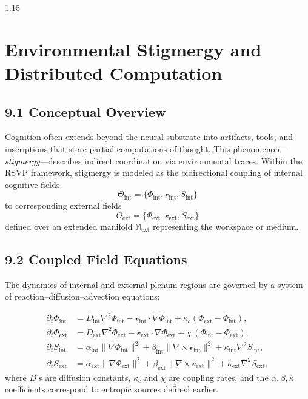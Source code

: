\documentclass[12pt,a4paper]{article}
\begin{document}
\begin{spacing}{1.15}
\section{Environmental Stigmergy and Distributed Computation}

\subsection{9.1 Conceptual Overview}

Cognition often extends beyond the neural substrate into artifacts, tools, and inscriptions that store partial computations of thought.  
This phenomenon—\emph{stigmergy}—describes indirect coordination via environmental traces.  
Within the RSVP framework, stigmergy is modeled as the bidirectional coupling of internal cognitive fields
\[
\Theta_{\mathrm{int}}=\{\Phi_{\mathrm{int}},\boldsymbol{\mathcal v}_{\mathrm{int}},S_{\mathrm{int}}\}
\]
to corresponding external fields
\[
\Theta_{\mathrm{ext}}=\{\Phi_{\mathrm{ext}},\boldsymbol{\mathcal v}_{\mathrm{ext}},S_{\mathrm{ext}}\}
\]
defined over an extended manifold $\mathbb{M}_{\mathrm{ext}}$ representing the workspace or medium.

\subsection{9.2 Coupled Field Equations}

The dynamics of internal and external plenum regions are governed by a system of reaction–diffusion–advection equations:

\begin{align}
\partial_t \Phi_{\mathrm{int}}
 &= D_{\mathrm{int}}\nabla^2 \Phi_{\mathrm{int}}
    - \boldsymbol{\mathcal v}_{\mathrm{int}}\!\cdot\!\nabla \Phi_{\mathrm{int}}
    + \kappa_c(\Phi_{\mathrm{ext}}-\Phi_{\mathrm{int}}), \label{eq:phi_int}\\[3pt]
\partial_t \Phi_{\mathrm{ext}}
 &= D_{\mathrm{ext}}\nabla^2 \Phi_{\mathrm{ext}}
    - \boldsymbol{\mathcal v}_{\mathrm{ext}}\!\cdot\!\nabla \Phi_{\mathrm{ext}}
    + \chi\,(\Phi_{\mathrm{int}}-\Phi_{\mathrm{ext}}), \label{eq:phi_ext}\\[3pt]
\partial_t S_{\mathrm{int}}
 &= \alpha_{\mathrm{int}}\|\nabla\Phi_{\mathrm{int}}\|^2
    + \beta_{\mathrm{int}}\|\nabla\!\times\!\boldsymbol{\mathcal v}_{\mathrm{int}}\|^2
    + \kappa_{\mathrm{int}}\nabla^2 S_{\mathrm{int}}, \\
\partial_t S_{\mathrm{ext}}
 &= \alpha_{\mathrm{ext}}\|\nabla\Phi_{\mathrm{ext}}\|^2
    + \beta_{\mathrm{ext}}\|\nabla\!\times\!\boldsymbol{\mathcal v}_{\mathrm{ext}}\|^2
    + \kappa_{\mathrm{ext}}\nabla^2 S_{\mathrm{ext}},
\end{align}
where $D$’s are diffusion constants, $\kappa_c$ and $\chi$ are coupling rates, and the $\alpha,\beta,\kappa$ coefficients correspond to entropic sources defined earlier.


\end{spacing}
\end{document}
